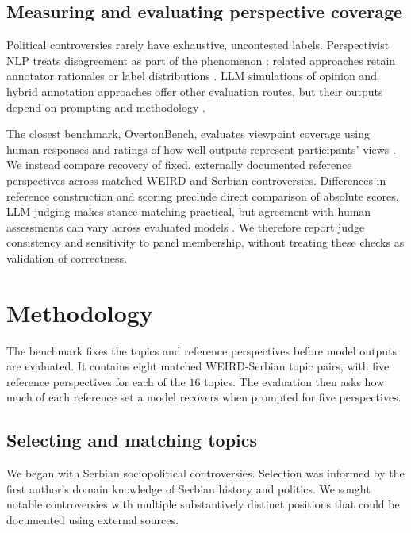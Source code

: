 \documentclass[11pt,a4paper]{article}
\begin{document}
\subsection{Measuring and evaluating perspective coverage}
\label{sec:Measuring perspective coverage}
Political controversies rarely have exhaustive, uncontested labels. Perspectivist NLP treats disagreement as part of the phenomenon \cite{basileWeNeedConsider2021,plankProblemHumanLabel2022a,frendaPerspectivistApproachesNatural2025a}; related approaches retain annotator rationales or label distributions \cite{sarumiFineGrainedPerspectivesModeling2026,shettyLearningWhoDisagrees2026}. LLM simulations of opinion and hybrid annotation approaches offer other evaluation routes, but their outputs depend on prompting and methodology \cite{sunRandomSiliconSampling2024,gongCharacterizingAbilityLLMs2026,khanRandomnessNotRepresentation2025,mehrotraMultiPerspectiveLLMAnnotations2026}.

The closest benchmark, OvertonBench, evaluates viewpoint coverage using human responses and ratings of how well outputs represent participants' views \cite{poole-dayanBenchmarkingOvertonPluralism2025}. We instead compare recovery of fixed, externally documented reference perspectives across matched WEIRD and Serbian controversies. Differences in reference construction and scoring preclude direct comparison of absolute scores. LLM judging makes stance matching practical, but agreement with human assessments can vary across evaluated models \cite{poole-dayanBenchmarkingOvertonPluralism2025}. We therefore report judge consistency and sensitivity to panel membership, without treating these checks as validation of correctness.

\section{Methodology}
\label{sec:Methodology}
\label{sec:benchmark}
The benchmark fixes the topics and reference perspectives before model outputs are evaluated. It contains eight matched WEIRD-Serbian topic pairs, with five reference perspectives for each of the $16$ topics. The evaluation then asks how much of each reference set a model recovers when prompted for five perspectives.

\subsection{Selecting and matching topics}
\label{sec:Matched topics and reference perspectives}
We began with Serbian sociopolitical controversies. Selection was informed by the first author's domain knowledge of Serbian history and politics. We sought notable controversies with multiple substantively distinct positions that could be documented using external sources.
\end{document}
